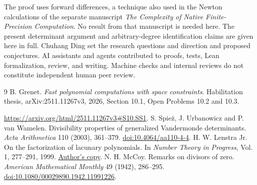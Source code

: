 \documentclass[10pt]{article}
\begin{document}
The proof uses forward differences, a technique also used in the
Newton calculations of the separate manuscript
\emph{The Complexity of Native Finite-Precision Computation}.
No result from that manuscript is needed here. The present
determinant argument and arbitrary-degree identification claims are
given here in full. Chuhang Ding set the research questions and direction and proposed conjectures. AI assistants and agents contributed to proofs, tests, Lean formalization, review, and writing. Machine checks and internal reviews do not constitute independent human peer review.

\begin{thebibliography}{9}
 B. Grenet. \emph{Fast polynomial computations with space
constraints}. Habilitation thesis, arXiv:2511.11267v3, 2026,
Section 10.1, Open Problems 10.2 and 10.3.\par\url{https://arxiv.org/html/2511.11267v3#S10.SS1}.
 S. Spie\.z, J. Urbanowicz and P. van Wamelen.
Divisibility properties of generalized Vandermonde determinants.
\emph{Acta Arithmetica} 110 (2003), 361--379.
\href{https://doi.org/10.4064/aa110-4-4}{doi:10.4064/aa110-4-4}.
 H. W. Lenstra Jr. On the factorization of lacunary
polynomials. In \emph{Number Theory in Progress}, Vol. 1, 277--291, 1999.
\href{https://pub.math.leidenuniv.nl/~lenstrahw/PUBLICATIONS/1999b/art.pdf}{Author's copy}.
 N. H. McCoy. Remarks on divisors of zero.
\emph{American Mathematical Monthly} 49 (1942), 286--295.
\href{https://doi.org/10.1080/00029890.1942.11991226}{doi:10.1080/00029890.1942.11991226}.
\end{thebibliography}
\end{document}
